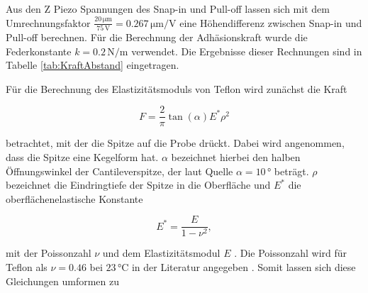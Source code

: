Aus den Z Piezo Spannungen des Snap-in und Pull-off lassen sich mit dem Umrechnungsfaktor $\frac{20\,\si{\micro\meter}}{75\,\si{\volt}}=0.267\,\si{\micro\meter\per\volt}$ \cite{anleitung}
eine Höhendifferenz zwischen Snap-in und Pull-off berechnen. Für die Berechnung der Adhäsionskraft wurde die Federkonstante $k=0.2\,\si{\newton\per\meter}$ \cite{anleitung} verwendet.
Die Ergebnisse dieser Rechnungen sind in Tabelle \ref{tab:KraftAbstand} eingetragen.

\begin{table}
    \centering
    \caption{Ermittelte Werte für Snap-in und Pull-off für Edelstahl, Silizium und Teflon. Außerdem sind die errechneten Werte für die Höhendifferenz und die Adhäsionskraft eingetragen.}
    \label{tab:KraftAbstand}
\end{table}

Für die Berechnung des Elastizitätsmoduls von Teflon wird zunächst die Kraft

\begin{equation}
    F=\frac{2}{\pi}\tan(\alpha)E^*\rho^2
\end{equation}

betrachtet, mit der die Spitze auf die Probe drückt. Dabei wird angenommen, dass die Spitze eine Kegelform hat.
$\alpha$ bezeichnet hierbei den halben Öffnungswinkel der Cantileverspitze, der laut Quelle \cite{anleitung} $\alpha=10\,\si{\degree}$ beträgt.
$\rho$ bezeichnet die Eindringtiefe der Spitze in die Oberfläche und $E^*$ die oberflächenelastische Konstante

\begin{equation}
    E^*=\frac{E}{1-\nu^2},
\end{equation}

mit der Poissonzahl $\nu$ und dem Elastizitätsmodul $E$ \cite{Elasti}. Die Poissonzahl wird für Teflon als $\nu=0.46$ bei $23\,\si{\celsius}$ in der Literatur angegeben \cite{P}.
Somit lassen sich diese Gleichungen umformen zu

